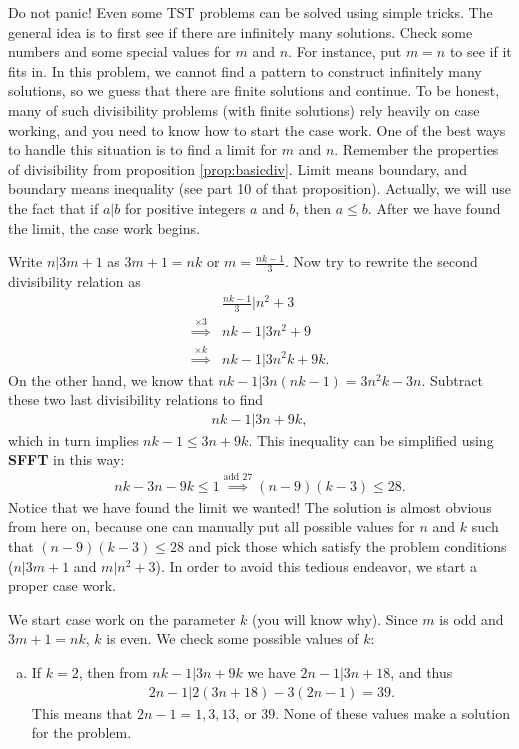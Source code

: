 \documentclass{subfile}
\begin{document}
	\begin{solution}
		Do not panic! Even some TST problems can be solved using simple tricks. The general idea is to first see if there are infinitely many solutions. Check some numbers and some special values for $m$ and $n$. For instance, put $m=n$ to see if it fits in. In this problem, we cannot find a pattern to construct infinitely many solutions, so we guess that there are finite solutions and continue. To be honest, many of such divisibility problems (with finite solutions) rely heavily on case working, and you need to know how to start the case work. One of the best ways to handle this situation is to find a limit for $m$ and $n$. Remember the properties of divisibility from proposition \eqref{prop:basicdiv}. Limit means boundary, and boundary means inequality (see part 10 of that proposition). Actually, we will use the fact that if $a|b$ for positive integers $a$ and $b$, then $a \leq b$. After we have found the limit, the case work begins.

		Write $n|3m+1$ as $3m+1=nk$ or $m=\frac{nk-1}{3}$. Now try to rewrite the second divisibility relation as
			\begin{align*}
				& \frac{nk-1}{3} \bigg| n^2 + 3 \\
				\stackrel{\times 3}{\implies} & nk-1|3n^2+9 \\
				\stackrel{\times k}{\implies} & nk-1|3n^2k+9k.
			\end{align*}
		On the other hand, we know that $nk-1|3n(nk-1)=3n^2k-3n$. Subtract these two last divisibility relations to find
			\begin{align*}
				nk-1 | 3n+9k,
			\end{align*}
		which in turn implies $nk-1 \leq 3n+9k$. This inequality can be simplified using \textbf{SFFT} in this way:
			\begin{align*}
				nk-3n-9k\leq 1 \stackrel{\text{add }27}{\implies} (n-9)(k-3) \leq 28.
			\end{align*}
		Notice that we have found the limit we wanted! The solution is almost obvious from here on, because one can manually put all possible values for $n$ and $k$ such that $(n-9)(k-3) \leq 28$ and pick those which satisfy the problem conditions ($n|3m+1$ and $m|n^2+3$). In order to avoid this tedious endeavor, we start a proper case work.

		We start case work on the parameter $k$ (you will know why). Since $m$ is odd and $3m+1=nk$, $k$ is even. We check some possible values of $k$:
			\begin{enumerate}[(a)]
				\item If $k=2$, then from $nk-1|3n+9k$ we have $2n-1|3n+18$, and thus
					\begin{align*}
						2n-1|2(3n+18)-3(2n-1)=39.
					\end{align*}
				 This means that $2n-1=1, 3, 13$, or $39$. None of these values make a solution for the problem.


\end{enumerate}
\end{solution}
\end{document}
